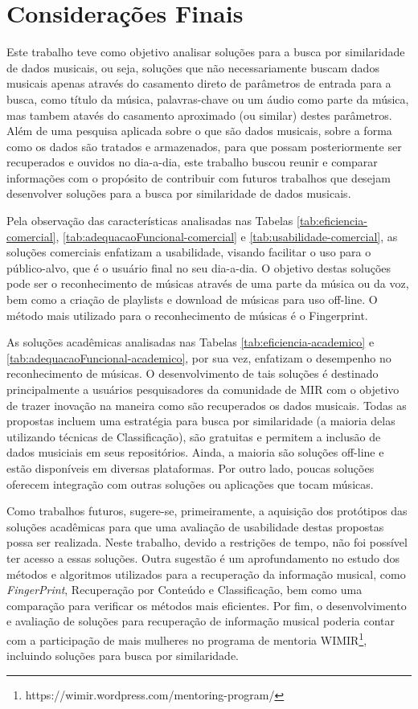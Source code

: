 \section{Considerações Finais} \label{cap:consideracoes-finais}

Este trabalho teve como objetivo analisar soluções para a busca por similaridade de dados musicais, ou seja, soluções que não necessariamente buscam dados musicais apenas através do casamento direto de parâmetros de entrada para a busca, como título da música, palavras-chave ou um áudio como parte da música, mas tambem atavés do casamento aproximado (ou similar) destes parâmetros. Além de uma pesquisa aplicada sobre o que são dados musicais, sobre a forma como os dados são tratados e armazenados, para que possam posteriormente ser recuperados e ouvidos no dia-a-dia, este trabalho buscou reunir e comparar informações com o propósito de contribuir com futuros trabalhos que desejam desenvolver soluções para a busca por similaridade de dados musicais.

Pela observação das características analisadas nas Tabelas \ref{tab:eficiencia-comercial}, \ref{tab:adequacaoFuncional-comercial} e \ref{tab:usabilidade-comercial}, as soluções comerciais enfatizam a usabilidade, visando facilitar o uso para o público-alvo, que é o usuário final no seu dia-a-dia. O objetivo destas soluções pode ser o reconhecimento de músicas através de uma parte da música ou da voz, bem como a criação de playlists e download de músicas para uso off-line. O método mais utilizado para o reconhecimento de músicas é o Fingerprint.

As soluções acadêmicas analisadas nas Tabelas \ref{tab:eficiencia-academico} e \ref{tab:adequacaoFuncional-academico}, por sua vez, enfatizam o desempenho no reconhecimento de músicas. O desenvolvimento de tais soluções é destinado principalmente a usuários pesquisadores da comunidade de MIR com o objetivo de trazer inovação na maneira como são recuperados os dados musicais. Todas as propostas incluem uma estratégia para busca por similaridade (a maioria delas utilizando técnicas de Classificação), são gratuitas e permitem a inclusão de dados musiciais em seus repositórios. Ainda, a maioria são soluções off-line e estão disponíveis em diversas plataformas. Por outro lado, poucas soluções oferecem integração com outras soluções ou aplicações que tocam músicas. 

Como trabalhos futuros, sugere-se, primeiramente, a aquisição dos protótipos das soluções acadêmicas para que uma avaliação de usabilidade destas propostas possa ser realizada. Neste trabalho, devido a restrições de tempo, não foi possível ter acesso a essas soluções. Outra sugestão é um aprofundamento no estudo dos métodos e algoritmos utilizados para a recuperação da informação musical, como \textit{FingerPrint}, Recuperação por Conteúdo e Classificação, bem como uma comparação para verificar os métodos mais eficientes. Por fim, o desenvolvimento e avaliação de soluções para recuperação de informação musical poderia contar com a participação de mais mulheres no programa de mentoria WIMIR\footnote{https://wimir.wordpress.com/mentoring-program/}, incluindo soluções para busca por similaridade.